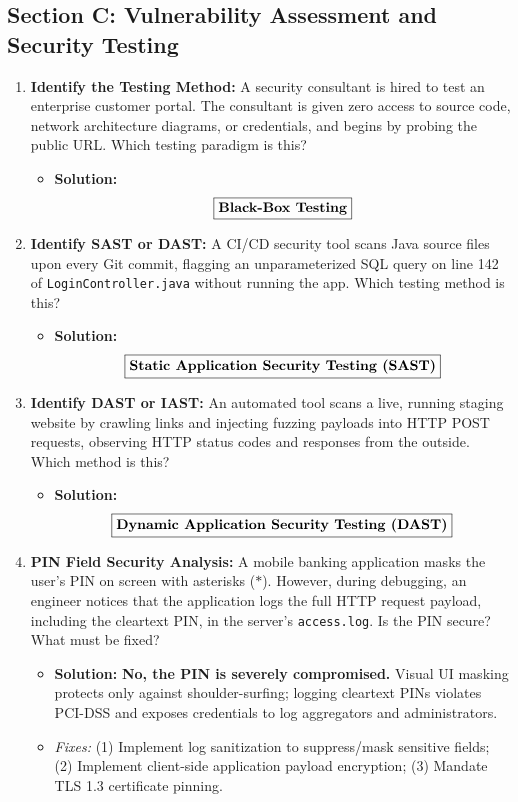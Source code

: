 \subsection{Section C: Vulnerability Assessment and Security Testing}

\begin{enumerate}[label=\textbf{Problem \arabic*.,resume},leftmargin=1.5cm]
\item \textbf{Identify the Testing Method:}
A security consultant is hired to test an enterprise customer portal. The consultant is given zero access to source code, network architecture diagrams, or credentials, and begins by probing the public URL. Which testing paradigm is this?
\begin{itemize}
\item \textbf{Solution:}
\[ \boxed{\text{\textbf{Black-Box Testing}}} \]
\end{itemize}

\item \textbf{Identify SAST or DAST:}
A CI/CD security tool scans Java source files upon every Git commit, flagging an unparameterized SQL query on line 142 of \texttt{LoginController.java} without running the app. Which testing method is this?
\begin{itemize}
\item \textbf{Solution:}
\[ \boxed{\text{\textbf{Static Application Security Testing (SAST)}}} \]
\end{itemize}

\item \textbf{Identify DAST or IAST:}
An automated tool scans a live, running staging website by crawling links and injecting fuzzing payloads into HTTP POST requests, observing HTTP status codes and responses from the outside. Which method is this?
\begin{itemize}
\item \textbf{Solution:}
\[ \boxed{\text{\textbf{Dynamic Application Security Testing (DAST)}}} \]
\end{itemize}

\item \textbf{PIN Field Security Analysis:}
A mobile banking application masks the user's PIN on screen with asterisks ($\ast$). However, during debugging, an engineer notices that the application logs the full HTTP request payload, including the cleartext PIN, in the server's \texttt{access.log}. Is the PIN secure? What must be fixed?
\begin{itemize}
\item \textbf{Solution:} \textbf{No, the PIN is severely compromised.} Visual UI masking protects only against shoulder-surfing; logging cleartext PINs violates PCI-DSS and exposes credentials to log aggregators and administrators.
\item \textit{Fixes:} (1) Implement log sanitization to suppress/mask sensitive fields; (2) Implement client-side application payload encryption; (3) Mandate TLS 1.3 certificate pinning.
\end{itemize}


\end{enumerate}
